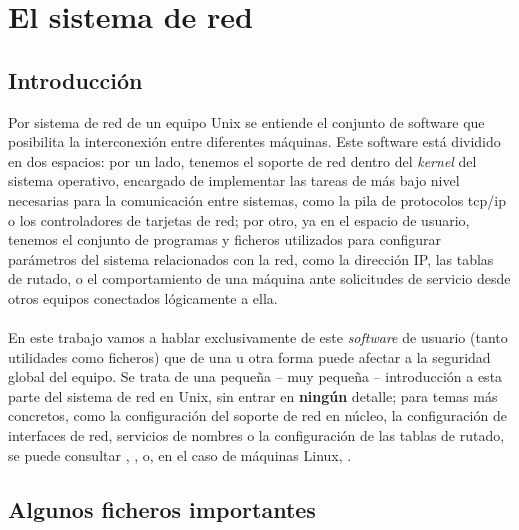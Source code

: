 \chapter{El sistema de red}
\section{Introducci\'on}
Por sistema de red de un equipo Unix se entiende el conjunto de software que
posibilita la interconexi\'on entre diferentes m\'aquinas. Este software est\'a 
dividido en dos espacios: por un lado, tenemos el soporte de red dentro del 
{\it kernel} del sistema operativo, encargado de implementar las tareas de
m\'as bajo nivel necesarias para la comunicaci\'on entre sistemas, como la
pila de protocolos {\sc tcp/ip} o los controladores de tarjetas de red; por 
otro, ya en el espacio de
usuario, tenemos el conjunto de programas y ficheros utilizados para configurar 
par\'ametros del sistema relacionados con la red, como la direcci\'on {\sc IP}, 
las tablas de rutado, o el comportamiento de una m\'aquina ante solicitudes de 
servicio desde otros equipos conectados l\'ogicamente a ella.\\
\\En este trabajo vamos a hablar exclusivamente de este {\it software} de 
usuario (tanto utilidades como ficheros) que de una u otra forma puede afectar 
a la seguridad global del equipo. Se trata de una peque\~na -- muy peque\~na -- 
introducci\'on a esta parte del sistema de red en Unix, sin entrar en {\bf
ning\'un} detalle; para temas m\'as concretos, como la configuraci\'on del 
soporte de red en n\'ucleo, la configuraci\'on de interfaces de red, servicios 
de nombres o la configuraci\'on de las tablas de rutado, se puede consultar 
\cite{kn:fri95}, \cite{kn:hun92}, \cite{kn:nem89} o, en el caso de m\'aquinas 
Linux, \cite{kn:kir95}.
\section{Algunos ficheros importantes}
